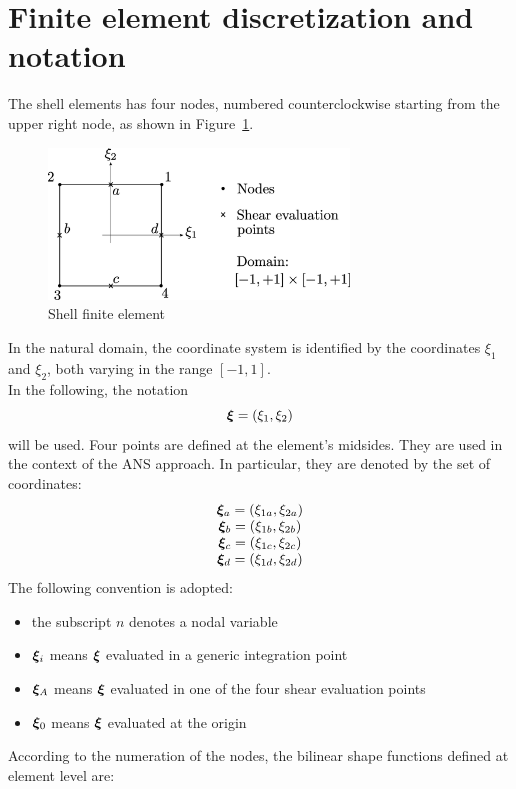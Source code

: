 \section{Finite element discretization and notation}
The shell elements has four nodes, numbered counterclockwise
starting from the upper right node, as shown in Figure~\ref{fig:shell}.
\begin{figure}[htbp]
\centering
\includegraphics[width=8cm]{shellPic.eps}
\caption{Shell finite element}
\label{fig:shell}
\end{figure}
In the natural domain, the coordinate system is identified by the coordinates $\xi_1$ and $\xi_2$, both varying in the range $[-1, 1]$. \\
In the following, the notation
\begin{equation}
\bm{\xi} = \left( \xi_{1},\xi_{2} \right)
\end{equation}
will be used.
Four points are defined at the element's midsides.
They are used in the context of the ANS approach.
In particular, they are denoted by the set of coordinates:
\begin{equation}
\vvect{c}{
\T{\xi}_a = \plbr{\xi_{1a},\xi_{2a}} \\
\T{\xi}_b = \plbr{\xi_{1b},\xi_{2b}} \\
\T{\xi}_c = \plbr{\xi_{1c},\xi_{2c}} \\
\T{\xi}_d = \plbr{\xi_{1d},\xi_{2d}}
}
\label{eq:xiSep}
\end{equation}
The following convention is adopted:
\begin{itemize}
	\item the subscript $n$ denotes a nodal variable
  \item $\bm{\xi}_i$ means $\bm{\xi}$ evaluated in a generic integration point
  \item $\bm{\xi}_A$ means $\bm{\xi}$ evaluated in one of the four shear evaluation points
  \item $\bm{\xi}_0$ means $\bm{\xi}$ evaluated at the origin
\end{itemize}
According to the numeration of the nodes, the bilinear shape functions defined at element level are:

